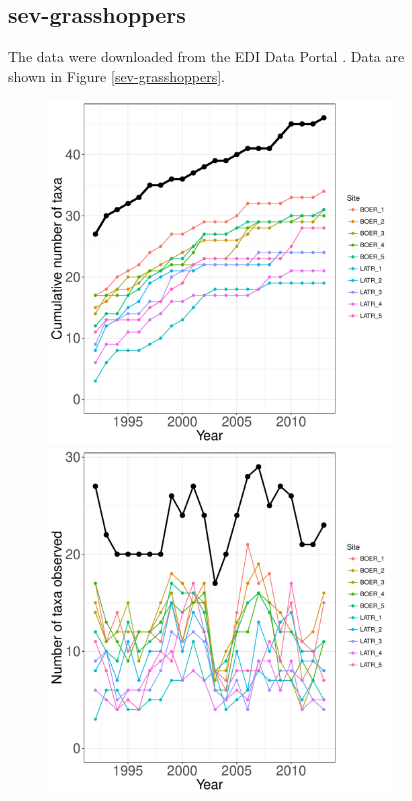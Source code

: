 \documentclass[11pt, oneside]{article}
\begin{document}
\begin{figure}[h!]
\subsection {sev-grasshoppers}
The data were downloaded from the EDI Data Portal \citep{sev-grasshopper}.
Data are shown in Figure \ref{sev-grasshoppers}.
  

\begin{figure}[h!]
\centering
\includegraphics[scale = 0.4]{sev-grasshopper-compagnoni_species_accumulation_curve.pdf}
\includegraphics[scale = 0.4]{sev-grasshopper-compagnoni_num_taxa_over_time.pdf}

\end{figure}
\end{figure}
\end{document}
